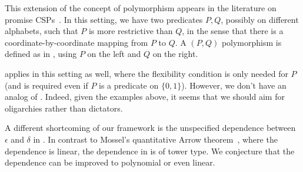 \documentclass{article}
\theoremstyle{definition}
\theoremstyle{remark}
\begin{document}
This extension of the concept of polymorphism appears in the literature on promise CSPs~\cite{AGH17,BG21,BBKO21}. In this setting, we have two predicates $P,Q$, possibly on different alphabets, such that $P$ is more restrictive than $Q$, in the sense that there is a coordinate-by-coordinate mapping from $P$ to $Q$. A $(P,Q)$ polymorphism is defined as in , using $P$ on the left and $Q$ on the right.

 applies in this setting as well, where the flexibility condition is only needed for $P$ (and is required even if $P$ is a predicate on $\{0, 1\}$). However, we don't have an analog of . Indeed, given the examples above, it seems that we should aim for oligarchies rather than dictators.

\medskip

A different shortcoming of our framework is the unspecified dependence between $\epsilon$ and $\delta$ in . In contrast to Mossel's quantitative Arrow theorem~\cite{Mossel12}, where the dependence is linear, the dependence in  is of tower type. We conjecture that the dependence can be improved to polynomial or even linear.



\end{document}
